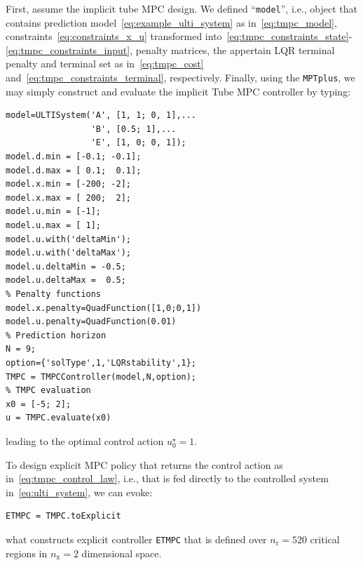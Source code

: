 \documentclass[letterpaper, 10 pt, conference]{ieeeconf}
\begin{document}
First, assume the implicit tube MPC design. We defined ``\verb|model|'', i.e., object that contains prediction model~\eqref{eq:example_ulti_system} as in~\eqref{eq:tmpc_model}, constraints~\eqref{eq:constraints_x_u} transformed into~\eqref{eq:tmpc_constraints_state}-\eqref{eq:tmpc_constraints_input}, penalty matrices, the appertain LQR terminal penalty and terminal set as in~\eqref{eq:tmpc_cost} and~\eqref{eq:tmpc_constraints_terminal}, respectively. 
Finally, using the \texttt{MPTplus}, we may simply construct and evaluate the implicit Tube MPC controller by typing:
\begin{lstlisting}[style=Matlab-editor]
model=ULTISystem('A', [1, 1; 0, 1],...
                 'B', [0.5; 1],...
                 'E', [1, 0; 0, 1]);
model.d.min = [-0.1; -0.1]; 
model.d.max = [ 0.1;  0.1];
model.x.min = [-200; -2]; 
model.x.max = [ 200;  2];
model.u.min = [-1];
model.u.max = [ 1];
model.u.with('deltaMin');
model.u.with('deltaMax');
model.u.deltaMin = -0.5;
model.u.deltaMax =  0.5;
% Penalty functions
model.x.penalty=QuadFunction([1,0;0,1])
model.u.penalty=QuadFunction(0.01)
% Prediction horizon
N = 9;
option={'solType',1,'LQRstability',1};
TMPC = TMPCController(model,N,option);
% TMPC evaluation
x0 = [-5; 2];
u = TMPC.evaluate(x0)
\end{lstlisting}
leading to the optimal control action $u_{0}^{\star} = 1$.

%

To design explicit MPC policy that returns the control action as in~\eqref{eq:tmpc_control_law}, i.e., that is fed directly to the controlled system in~\eqref{eq:ulti_system}, we can evoke:
\begin{lstlisting}[style=Matlab-editor]
ETMPC = TMPC.toExplicit
\end{lstlisting}
what constructs explicit controller \verb|ETMPC| that is defined over $n_\text{r} = 520$ critical regions in $n_\text{x} = 2$ dimensional space.
\end{document}
